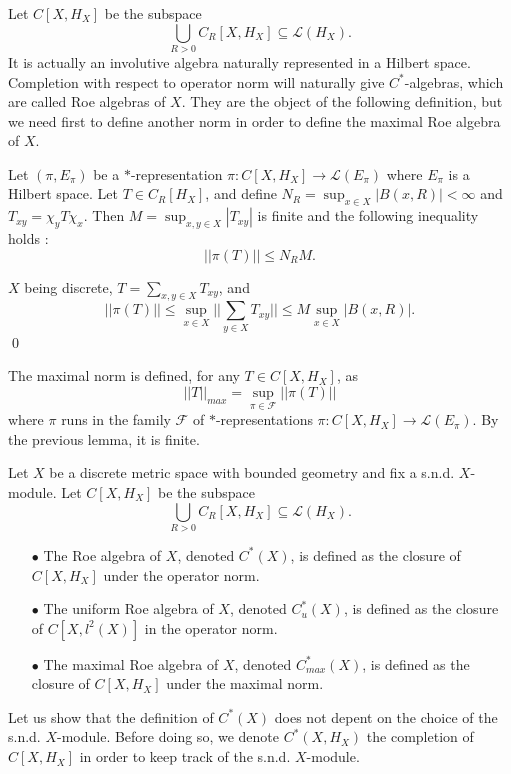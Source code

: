 Let $C[X,H_X]$ be the subspace 
\[\bigcup_{R>0} C_R[X,H_X]\subseteq \mathcal L(H_X).\] 
It is actually an involutive algebra naturally represented in a Hilbert space. Completion with respect to operator norm will naturally give $C^*$-algebras, which are called Roe algebras of $X$. They are the object of the following definition, but we need first to define another norm in order to define the maximal Roe algebra of $X$.\\

\begin{lem}
Let $(\pi, E_\pi)$ be a $*$-representation $\pi : C[X,H_X]\rightarrow \mathcal L(E_\pi)$ where $E_\pi$ is a Hilbert space. Let $T\in C_R[H_X]$, and define $N_R =\sup_{x\in X} |B(x,R)|<\infty$ and $T_{xy} = \chi_y T \chi_x$. Then $M=\sup_{x,y\in X} |T_{xy}|$ is finite and the following inequality holds :
\[||\pi(T)||\leq N_R M.\] 
\end{lem}
\begin{dem}
$X$ being discrete, $T=\sum_{x,y\in X} T_{xy}$, and 
\[||\pi(T)||\leq \sup_{x\in X} ||\sum_{y\in X} T_{xy}||\leq M \sup_{x\in X} |B(x,R)|.\]
\qed
\end{dem}

The maximal norm is defined, for any $T\in C[X,H_X]$, as 
\[||T||_{max} = \sup_{\pi\in\mathcal F} ||\pi(T)||\]
where $\pi$ runs in the family $\mathcal F$ of $*$-representations $\pi : C[X,H_X]\rightarrow \mathcal L(E_\pi)$. By the previous lemma, it is finite. 

\begin{definition}
Let $X$ be a discrete metric space with bounded geometry and fix a s.n.d. $X$-module. Let $C[X,H_X] $ be the subspace 
\[\bigcup_{R>0} C_R[X,H_X]\subseteq \mathcal L(H_X).\] 
\begin{itemize}
\item[$\bullet$] The Roe algebra of $X$, denoted $C^*(X)$, is defined as the closure of $C[X,H_X]$ under the operator norm.
\item[$\bullet$] The uniform Roe algebra of $X$, denoted $C_u^*(X)$, is defined as the closure of $C[X,l^2(X)]$ in the operator norm.
\item[$\bullet$] The maximal Roe algebra of $X$, denoted $C_{max}^*(X)$, is defined as the closure of $C[X,H_X]$ under the maximal norm. 
\end{itemize}
\end{definition}

Let us show that the definition of $C^*(X)$ does not depent on the choice of the s.n.d. $X$-module. Before doing so, we denote $C^*(X,H_X)$ the completion of $C[X,H_X]$ in order to keep track of the s.n.d. $X$-module.

